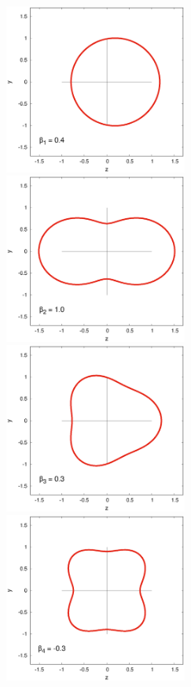\documentclass[a4paper,polish]{article}
\numberwithin{equation}{section}
\begin{document}
\vspace*{\fill}
\begin{figure}[ht!]
    \centering
    \includegraphics[width=6cm]{s1.eps}
    \hspace{1cm}
    \includegraphics[width=6cm]{s2.eps}\\    
    \vspace{1.5cm}
    \includegraphics[width=6cm]{s3.eps}
    \hspace{1cm}
    \includegraphics[width=6cm]{s4.eps}\\    

\end{figure}
\end{document}
